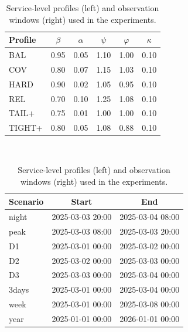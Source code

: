 \documentclass[letter,11pt, reqno]{amsart}
\begin{document}
\begin{table}[t]
\centering
\caption{Service-level profiles (left) and observation windows (right) used in the experiments.}
\label{tab:profiles_and_scenarios}
\begin{minipage}[t]{0.5\textwidth}
\centering
\small
\renewcommand{\arraystretch}{1.05}
\begin{tabular}{lccccc}
\toprule
\textbf{Profile} & \textbf{$\beta$} & \textbf{$\alpha$} & \textbf{$\psi$} & \textbf{$\varphi$} & \textbf{$\kappa$} \\
\midrule
BAL    & 0.95 & 0.05 & 1.10 & 1.00 & 0.10 \\
COV    & 0.80 & 0.07 & 1.15 & 1.03 & 0.10 \\
HARD   & 0.90 & 0.02 & 1.05 & 0.95 & 0.10 \\
REL    & 0.70 & 0.10 & 1.25 & 1.08 & 0.10 \\
TAIL+  & 0.75 & 0.01 & 1.00 & 1.00 & 0.10 \\
TIGHT+ & 0.80 & 0.05 & 1.08 & 0.88 & 0.10 \\
\bottomrule
\end{tabular}
\end{minipage}~%
\begin{minipage}[t]{0.5\textwidth}
\centering
\small
\renewcommand{\arraystretch}{1.05}
\begin{tabular}{lcc}
\toprule
\textbf{Scenario} & \textbf{Start} & \textbf{End} \\
\midrule
night & 2025-03-03 20:00 & 2025-03-04 08:00 \\
peak  & 2025-03-03 08:00 & 2025-03-03 20:00 \\
D1 & 2025-03-01 00:00 & 2025-03-02 00:00 \\
D2 & 2025-03-02 00:00 & 2025-03-03 00:00 \\
D3 & 2025-03-03 00:00 & 2025-03-04 00:00 \\
3days & 2025-03-01 00:00 & 2025-03-04 00:00 \\
week  & 2025-03-01 00:00 & 2025-03-08 00:00 \\
year  & 2025-01-01 00:00 & 2026-01-01 00:00 \\
\bottomrule
\end{tabular}
\end{minipage}

\end{table}

\end{document}

